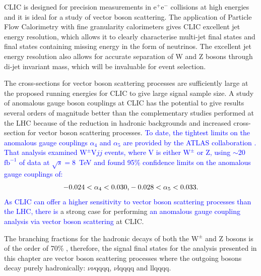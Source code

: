 CLIC is designed for precision measurements in $\text{e}^{+}\text{e}^{-}$ collisions at high energies and it is ideal for a study of vector boson scattering.  The application of Particle Flow Calorimetry with fine granularity calorimeters gives CLIC excellent jet energy resolution, which allows it to clearly characterise multi-jet final states and final states containing missing energy in the form of neutrinos.  The excellent jet energy resolution also allows for accurate separation of W and Z bosons through di-jet invariant mass, which will be invaluable for event selection.  

The cross-sections for vector boson scattering processes are sufficiently large at the proposed running energies for CLIC to give large signal sample size.  A study of anomalous gauge boson couplings at CLIC has the potential to give results several orders of magnitude better than the complementary studies performed at the LHC because of the reduction in hadronic backgrounds and increased cross-section for vector boson scattering processes.  \textcolor{blue}{To date, the tightest limits on the anomalous gauge couplings $\alpha_{4}$ and $\alpha_{5}$ are provided by the ATLAS collaboration \cite{Green:2016trm}.  That analysis examined $\text{W}^{\pm}\text{V}jj$ events, where V is either $\text{W}^{\pm}$ or Z, using $\sim$20 $\text{fb}^{-1}$ of data at $\sqrt{s} = 8$~TeV and found 95\% confidence limits on the anomalous gauge couplings of:}
%
\begin{equation}
-0.024 < \alpha_{4} < 0.030 \text{,} \\
-0.028 < \alpha_{5} < 0.033 \text{.}
\end{equation}
%
\textcolor{blue}{As CLIC can offer a higher sensitivity to vector boson scattering processes than the LHC, there is} a strong case for performing \textcolor{blue}{an anomalous gauge coupling analysis via vector boson scattering} at CLIC.  

The branching fractions for the hadronic decays of both the $\text{W}^{\pm}$ and Z bosons is of the order of 70\% \cite{Beringer:1900zz}, therefore, the signal final states for the analysis presented in this chapter are vector boson scattering processes where the outgoing bosons decay purely hadronically: $\nu\nu\text{qqqq}$, $\nu\text{lqqqq}$ and llqqqq.  


